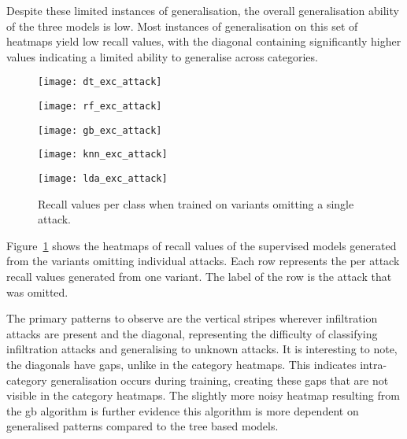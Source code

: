 Despite these limited instances of generalisation, the overall generalisation
ability of the three models is low. Most instances of generalisation on this
set of heatmaps yield low recall values, with the diagonal containing
significantly higher values indicating a limited ability to generalise across
categories.
%
\begin{figure}[htbp]
    \centering
    \begin{minipage}[h]{0.5\textwidth}
        \centering
        \texttt{[image: dt\_exc\_attack]}
    \end{minipage}\hfill
    \begin{minipage}[h]{0.5\textwidth}
        \centering
        \texttt{[image: rf\_exc\_attack]}
    \end{minipage}
    \begin{minipage}[h]{0.5\textwidth}
        \centering
        \texttt{[image: gb\_exc\_attack]}
    \end{minipage}\hfill
    \begin{minipage}[h]{0.5\textwidth}
        \centering
        \texttt{[image: knn\_exc\_attack]}
    \end{minipage}
    \begin{minipage}[h]{0.5\textwidth}
        \centering
        \texttt{[image: lda\_exc\_attack]}
    \end{minipage}
    \caption[Individual Attack Omission Results.]{Recall values per class when trained on variants omitting a single attack.\label{fig:exc_att}}
\end{figure}
%
Figure~\ref{fig:exc_att} shows the heatmaps of recall values of the supervised
models generated from the variants omitting individual attacks. Each row
represents the per attack recall values generated from one variant. The label
of the row is the attack that was omitted.

The primary patterns to observe are the vertical stripes wherever infiltration
attacks are present and the diagonal, representing the difficulty of
classifying infiltration attacks and generalising to unknown attacks. It is
interesting to note, the diagonals have gaps, unlike in the category heatmaps.
This indicates intra-category generalisation occurs during training, creating
these gaps that are not visible in the category heatmaps. The slightly more
noisy heatmap resulting from the \gls{gb} algorithm is further evidence this
algorithm is more dependent on generalised patterns compared to the tree based
models.

